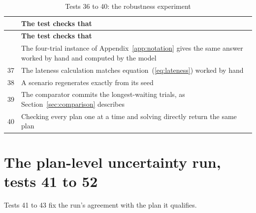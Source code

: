 \begin{longtable}{@{}rp{}@{}}
  \caption{Tests 36 to 40: the robustness experiment}
  \label{tab:tests5}\\
  \toprule
  & \textbf{The test checks that} \\
  \midrule
  \endfirsthead
  \toprule
  & \textbf{The test checks that} \\
  \midrule
  \endhead
  \bottomrule
  \endfoot
  36 & The four-trial instance of Appendix~\ref{app:notation} gives the same answer worked by hand and computed by the model \\
  37 & The lateness calculation matches equation~(\ref{eq:lateness}) worked by hand \\
  38 & A scenario regenerates exactly from its seed \\
  39 & The comparator commits the longest-waiting trials, as Section~\ref{sec:comparison} describes \\
  40 & Checking every plan one at a time and solving directly return the same plan \\
\end{longtable}

\section{The plan-level uncertainty run, tests 41 to 52}
\label{sec:testsuncertainty}

Tests 41 to 43 fix the run's agreement with the plan it qualifies.

